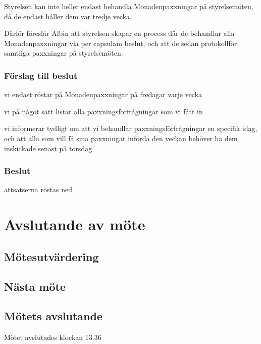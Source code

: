 \documentclass[protokoll]{dvd}
\begin{document}
Styrelsen kan inte heller endast behandla Monadenpaxxningar på styrelsemöten, då de endast håller dem var tredje vecka.

Därför föreslår Albin att styrelsen skapar en process där de behandlar alla Monadenpaxxningar via per capsulam beslut, och att de sedan protokollför samtliga paxxningar på styrelsemöten.


\subsubsection*{Förslag till beslut}

\begin{attsatser}
    \item vi endast röstar på Monadenpaxxningar på fredagar varje vecka
    \item vi på något sätt listar alla paxxningsförfrågningar som vi fått in 
    \item vi informerar tydligt om att vi behandlar paxxningsförfrågningar en specifik idag, och att alla som vill få sina paxxningar införda den veckan behöver ha dem inskickade senast på torsdag
\end{attsatser}


\subsubsection*{Beslut}
\begin{attsatser}
    \item attsatserna röstas ned 
\end{attsatser}



\section{Avslutande av möte}

\subsection{Mötesutvärdering}

\subsection{Nästa möte}

\subsection{Mötets avslutande}

Mötet avslutades klockan 13.36

\styrelsesignaturer
\end{document}
